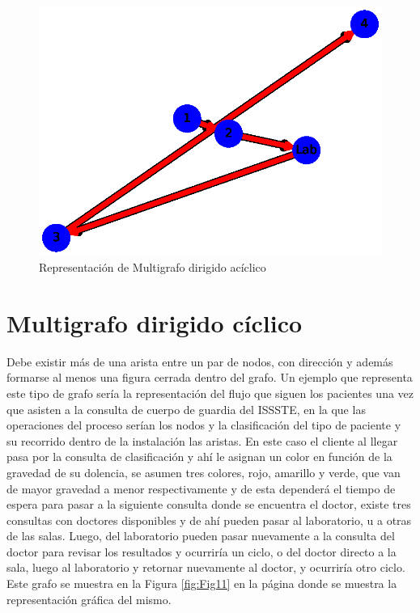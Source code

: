 \documentclass{article}
\begin{document}
\begin{figure}
    \centering
    \includegraphics[scale=0.6]{imagenes/Fig10.eps}
    \caption{Representación de Multigrafo dirigido acíclico}
    \label{fig:Fig10}
\end{figure}

\section{Multigrafo dirigido cíclico}

Debe existir más de una arista entre un par de nodos, con dirección y además formarse al menos una figura cerrada dentro del grafo. 
Un ejemplo que representa este tipo de grafo sería la representación del flujo que siguen los pacientes una vez que asisten a la consulta de cuerpo de guardia del ISSSTE, en la que las operaciones del proceso serían los nodos y la clasificación del tipo de paciente y su recorrido dentro de la instalación las aristas. En este caso el cliente al llegar pasa por la consulta de clasificación y ahí le asignan un color en función de la gravedad de su dolencia, se asumen tres colores, rojo, amarillo y verde, que van de mayor gravedad a menor respectivamente y de esta dependerá el tiempo de espera para pasar a la siguiente consulta donde se encuentra el doctor, existe tres consultas con doctores disponibles y de ahí pueden pasar al laboratorio, u a otras de las salas. Luego, del laboratorio pueden pasar nuevamente a la consulta del doctor para revisar los resultados y ocurriría un ciclo, o del doctor directo a la sala, luego al laboratorio y retornar nuevamente al doctor, y ocurriría otro ciclo. Este grafo se muestra en la Figura \ref{fig:Fig11} en la página \pageref{fig:Fig11} donde se muestra la representación gráfica del mismo. 
\end{document}

